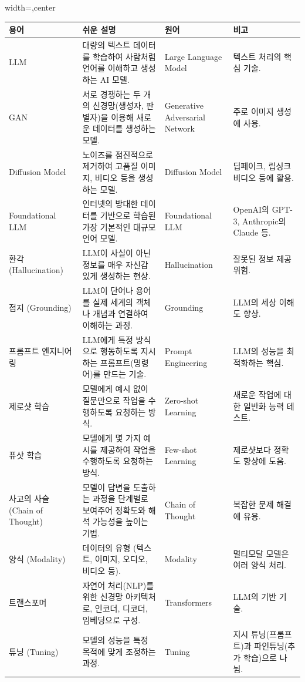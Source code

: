 \documentclass[11pt,a4paper]{article}
\begin{document}
\begin{adjustbox}{width=\textwidth,center}
\begin{tabular}{llll}
\toprule
\textbf{용어} & \textbf{쉬운 설명} & \textbf{원어} & \textbf{비고} \\
\midrule
LLM & 대량의 텍스트 데이터를 학습하여 사람처럼 언어를 이해하고 생성하는 AI 모델. & Large Language Model & 텍스트 처리의 핵심 기술. \\
GAN & 서로 경쟁하는 두 개의 신경망(생성자, 판별자)을 이용해 새로운 데이터를 생성하는 모델. & Generative Adversarial Network & 주로 이미지 생성에 사용. \\
Diffusion Model & 노이즈를 점진적으로 제거하여 고품질 이미지, 비디오 등을 생성하는 모델. & Diffusion Model & 딥페이크, 립싱크 비디오 등에 활용. \\
Foundational LLM & 인터넷의 방대한 데이터를 기반으로 학습된 가장 기본적인 대규모 언어 모델. & Foundational LLM & OpenAI의 GPT-3, Anthropic의 Claude 등. \\
환각 (Hallucination) & LLM이 사실이 아닌 정보를 매우 자신감 있게 생성하는 현상. & Hallucination & 잘못된 정보 제공 위험. \\
접지 (Grounding) & LLM이 단어나 용어를 실제 세계의 객체나 개념과 연결하여 이해하는 과정. & Grounding & LLM의 세상 이해도 향상. \\
프롬프트 엔지니어링 & LLM에게 특정 방식으로 행동하도록 지시하는 프롬프트(명령어)를 만드는 기술. & Prompt Engineering & LLM의 성능을 최적화하는 핵심. \\
제로샷 학습 & 모델에게 예시 없이 질문만으로 작업을 수행하도록 요청하는 방식. & Zero-shot Learning & 새로운 작업에 대한 일반화 능력 테스트. \\
퓨샷 학습 & 모델에게 몇 가지 예시를 제공하여 작업을 수행하도록 요청하는 방식. & Few-shot Learning & 제로샷보다 정확도 향상에 도움. \\
사고의 사슬 (Chain of Thought) & 모델이 답변을 도출하는 과정을 단계별로 보여주어 정확도와 해석 가능성을 높이는 기법. & Chain of Thought & 복잡한 문제 해결에 유용. \\
양식 (Modality) & 데이터의 유형 (텍스트, 이미지, 오디오, 비디오 등). & Modality & 멀티모달 모델은 여러 양식 처리. \\
트랜스포머 & 자연어 처리(NLP)를 위한 신경망 아키텍처로, 인코더, 디코더, 임베딩으로 구성. & Transformers & LLM의 기반 기술. \\
튜닝 (Tuning) & 모델의 성능을 특정 목적에 맞게 조정하는 과정. & Tuning & 지시 튜닝(프롬프트)과 파인튜닝(추가 학습)으로 나뉨. \\

\end{tabular}
\end{adjustbox}
\end{document}
